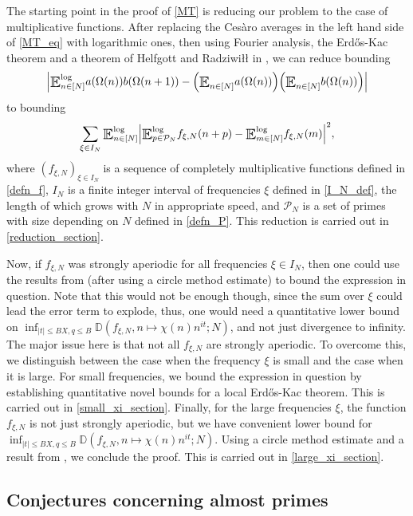 \documentclass[letter,11pt]{article}
\theoremstyle{plain} %
\theoremstyle{definition} %
\theoremstyle{plain}
\theoremstyle{plain}
\theoremstyle{plain}
\numberwithin{equation}{section}
\newcommand{\Cesaro}{Ces\`{a}ro}
\newcommand{\Erdos}{Erd\H{o}s}
\newcommand{\Radziwill}{Radziwi\l\l{}}
\renewcommand{\leq}{\leqslant}
\newcommand{\E}{\raisebox{-0.4ex}{\scalebox{1.4}[1.3]{$\mathbb{E}$}}}
\newcommand{\Esub}[1]{\raisebox{-0.4ex}{\scalebox{1.4}[1.3]{$\mathbb{E}$}}\raisebox{-0.35ex}{\ensuremath{_{\scriptstyle #1}}}}
\newcommand{\logE}{{\E}^{\log}}
\newcommand{\Dist}{\mathbb{D}}
\newcommand{\1}{\mathbbm{1}}
\newcommand{\f}{f_{\xi,N}}
\newcommand{\Pc}{\mathcal{P}}
\begin{document}
The starting point in the proof of \cref{MT} is reducing our problem to the case of multiplicative functions. After replacing the \Cesaro{} averages in the left hand side of \eqref{MT_eq} with logarithmic ones, then using Fourier analysis, the \Erdos-Kac theorem and a theorem of Helfgott and \Radziwill{} in \cite{helf_radz}, we can reduce bounding 
$$\Big|\logE_{n\in[N]}a(\Omega(n))b(\Omega(n+1)) - \Big(\Esub{n\in[N]}a(\Omega(n))\Big)\Big(\Esub{n\in[N]}b(\Omega(n))\Big)\Big|$$
to bounding
$$\sum_{\xi\in I_N}\logE_{n\in[N]}\Big|\logE_{p\in\Pc_N} \f(n+p) - \logE_{m\in[N]}\f(m)\Big|^2,$$
where $(\f)_{\xi\in I_N}$ is a sequence of completely multiplicative functions defined in \eqref{defn_f}, $I_N$ is a finite integer interval of frequencies $\xi$ defined in \eqref{I_N_def}, the length of which grows with $N$ in appropriate speed, and $\Pc_N$ is a set of primes with size depending on $N$ defined in \eqref{defn_P}. This reduction is carried out in \cref{reduction_section}.

Now, if $\f$ was strongly aperiodic for all frequencies $\xi\in I_N$, then one could use the results from \cite{MRT15} (after using a circle method estimate) to bound the expression in question. Note that this would not be enough though, since the sum over $\xi$ could lead the error term to explode, thus, one would need a quantitative lower bound on $\inf_{|t|\leq BX,q\leq B}\Dist(\f,n\mapsto\chi(n) n^{it};N)$, and not just divergence to infinity.
The major issue here is that not all $\f$ are strongly aperiodic. To overcome this, we distinguish between the case when the frequency $\xi$ is small and the case when it is large. For small frequencies, we bound the expression in question by establishing quantitative novel bounds for a local \Erdos-Kac theorem. This is carried out in \cref{small_xi_section}. Finally, for the large frequencies $\xi$, the function $\f$ is not just strongly aperiodic, but we have convenient lower bound for $\inf_{|t|\leq BX,q\leq B}\Dist(\f,n\mapsto\chi(n) n^{it};N)$. Using a circle method estimate and a result from \cite{MRT15}, we conclude the proof. This is carried out in \cref{large_xi_section}.


\subsection{Conjectures concerning almost primes}
\end{document}
